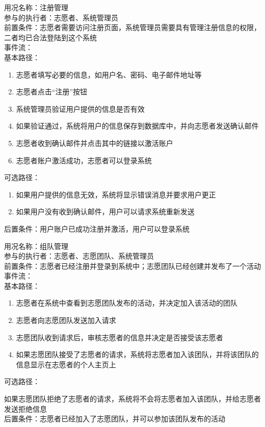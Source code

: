 \begin{framed}
\noindent
用况名称：注册管理\\
参与的执行者：志愿者、系统管理员\\
前置条件：志愿者需要访问注册页面，系统管理员需要具有管理注册信息的权限，二者均已合法登陆到这个系统\\
事件流：\\
基本路径：
\begin{enumerate}[itemsep=2pt,topsep=0pt,parsep=0pt,itemindent=1em]
   \item 志愿者填写必要的信息，如用户名、密码、电子邮件地址等\item 志愿者点击“注册”按钮
   \item 系统管理员验证用户提供的信息是否有效
   \item 如果验证通过，系统将用户的信息保存到数据库中，并向志愿者发送确认邮件
   \item 志愿者收到确认邮件并点击其中的链接以激活账户 
   \item 志愿者账户激活成功，志愿者可以登录系统
\end{enumerate}
\noindent
可选路径：\par
     \begin{enumerate}[itemsep=2pt,topsep=0pt,parsep=0pt,itemindent=1em] \item 如果用户提供的信息无效，系统将显示错误消息并要求用户更正
     \item 如果用户没有收到确认邮件，用户可以请求系统重新发送 
     \end{enumerate} 
后置条件：用户账户已成功注册并激活，用户可以登录系统
\end{framed}

\begin{framed}
\noindent
用况名称：组队管理\\
参与的执行者：志愿者、志愿团队、系统管理员\\
前置条件：志愿者已经注册并登录到系统中；志愿团队已经创建并发布了一个活动\\
事件流：\\
基本路径： \begin{enumerate}[itemsep=2pt,topsep=0pt,parsep=0pt,itemindent=1em] \item 志愿者在系统中查看到志愿团队发布的活动，并决定加入该活动的团队 \item 志愿者向志愿团队发送加入请求 \item 志愿团队收到请求后，审核志愿者的信息并决定是否接受该志愿者 \item 如果志愿团队接受了志愿者的请求，系统将志愿者加入该团队，并将该团队的信息显示在志愿者的个人主页上 \end{enumerate}
\noindent
可选路径：\par
     如果志愿团队拒绝了志愿者的请求，系统将不会将志愿者加入该团队，并给志愿者发送拒绝信息 \\
后置条件：志愿者已经加入了志愿团队，并可以参加该团队发布的活动

\end{framed}

